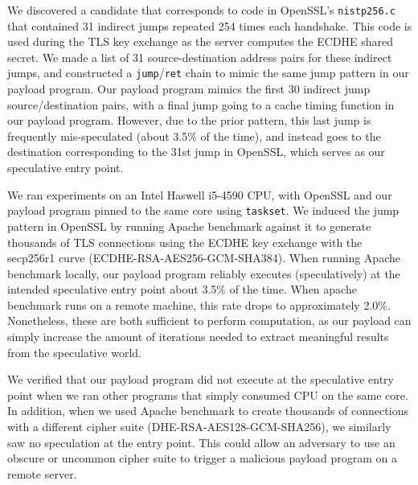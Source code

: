We discovered a candidate that corresponds to code in OpenSSL's
\texttt{nistp256.c} that contained 31 indirect jumps repeated 254 times each
handshake. This code is used during the TLS key exchange as the server computes
the ECDHE shared secret. We made a list of 31 source-destination address pairs
for these indirect jumps, and constructed a \texttt{jump}/\texttt{ret} chain to
mimic the same jump pattern in our payload program. Our payload program mimics
the first 30 indirect jump source/destination pairs, with a final jump going to
a cache timing function in our payload program. However, due to the prior
pattern, this last jump is frequently mis-speculated (about 3.5\% of the time),
and instead goes to the destination corresponding to the 31st jump in OpenSSL,
which serves as our speculative entry point.


We ran experiments on an Intel Haswell i5-4590 CPU, with OpenSSL and our payload
program pinned to the same core using \texttt{taskset}. We induced the jump
pattern in OpenSSL by running Apache benchmark against it to generate thousands
of TLS connections using the ECDHE key exchange with the secp256r1 curve
(ECDHE-RSA-AES256-GCM-SHA384). When running Apache benchmark locally, our
payload program reliably executes (speculatively) at the intended speculative
entry point about 3.5\% of the time. When apache benchmark runs on a remote
machine, this rate drops to approximately 2.0\%. Nonetheless, these are both
sufficient to perform computation, as our payload can simply increase the amount
of iterations needed to extract meaningful results from the speculative world.

We verified that our payload program did not execute at the speculative entry
point when we ran other programs that simply consumed CPU on the same core. In
addition, when we used Apache benchmark to create thousands of connections with
a different cipher suite (DHE-RSA-AES128-GCM-SHA256), we similarly saw no
speculation at the entry point. This could allow an adversary to use an obscure
or uncommon cipher suite to trigger a malicious \speculake payload program on a
remote server.


